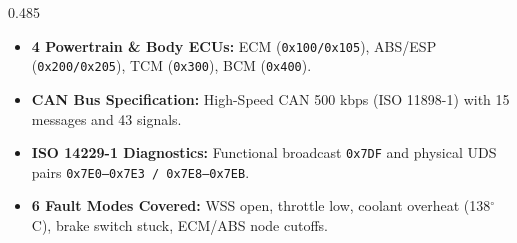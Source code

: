 \documentclass[aspectratio=169,10pt]{beamer}
\begin{document}
\begin{frame}[t]
\begin{columns}[T,totalwidth=\textwidth]
  \begin{column}{0.485\textwidth}
    \begin{tcolorbox}[cardstyle, colframe=accentgreen!75, colbacktitle=accentgreen!8, height=5.95cm,
      title={\normalsize\bfseries\color{accentgreen} Target Vehicle Network Scope}]
      \footnotesize\color{slatedark}\raggedright
      \vspace{2pt}
      \begin{itemize}\setlength{\itemsep}{6pt}\setlength{\leftmargini}{10pt}
        \item \textbf{4 Powertrain \& Body ECUs:} ECM (\texttt{0x100/0x105}), ABS/ESP (\texttt{0x200/0x205}), TCM (\texttt{0x300}), BCM (\texttt{0x400}).
        \item \textbf{CAN Bus Specification:} High-Speed CAN 500 kbps (ISO 11898-1) with 15 messages and 43 signals.
        \item \textbf{ISO 14229-1 Diagnostics:} Functional broadcast \texttt{0x7DF} and physical UDS pairs \texttt{0x7E0--0x7E3 / 0x7E8--0x7EB}.
        \item \textbf{6 Fault Modes Covered:} WSS open, throttle low, coolant overheat (138$^\circ$C), brake switch stuck, ECM/ABS node cutoffs.
      \end{itemize}
    \end{tcolorbox}
  \end{column}

\end{columns}

\end{frame}
\end{document}
